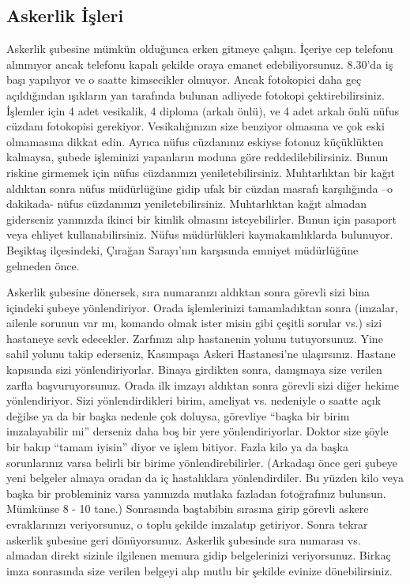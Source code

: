 \documentclass[12pt]{article}
\begin{document}
\subsection{Askerlik İşleri}

Askerlik şubesine mümkün olduğunca erken gitmeye çalışın. İçeriye cep telefonu alınmıyor ancak telefonu kapalı şekilde oraya emanet edebiliyorsunuz. 8.30’da iş başı yapılıyor ve o saatte kimsecikler olmuyor. Ancak fotokopici daha geç açıldığından ışıkların yan tarafında bulunan adliyede fotokopi çektirebilirsiniz. İşlemler için 4 adet vesikalik, 4 diploma (arkalı önlü), ve 4 adet arkalı önlü nüfus cüzdanı fotokopisi gerekiyor. Vesikalığınızın size benziyor olmasına ve çok eski olmamasına dikkat edin. Ayrıca nüfus cüzdanınız eskiyse fotonuz küçüklükten kalmaysa, şubede işleminizi yapanların moduna göre reddedilebilirsiniz. Bunun riskine girmemek için nüfus cüzdanınızı yeniletebilirsiniz. Muhtarlıktan bir kağıt aldıktan sonra nüfus müdürlüğüne gidip ufak bir cüzdan masrafı karşılığında –o dakikada- nüfus cüzdanınızı yeniletebilirsiniz. Muhtarlıktan kağıt almadan giderseniz yanınızda ikinci bir kimlik olmasını isteyebilirler. Bunun için pasaport veya ehliyet kullanabilirsiniz. Nüfus müdürlükleri kaymakamlıklarda bulunuyor. Beşiktaş ilçesindeki, Çırağan Sarayı’nın karşısında emniyet müdürlüğüne gelmeden önce. 

Askerlik şubesine dönersek, sıra numaranızı aldıktan sonra görevli sizi bina içindeki şubeye yönlendiriyor. Orada işlemlerinizi tamamladıktan sonra (imzalar, ailenle sorunun var mı, komando olmak ister misin gibi çeşitli sorular vs.) sizi hastaneye sevk edecekler. Zarfınızı alıp hastanenin yolunu tutuyorsunuz. Yine sahil yolunu takip ederseniz, Kasımpaşa Askeri Hastanesi’ne ulaşırsınız. Hastane kapısında sizi yönlendiriyorlar. 
Binaya girdikten sonra, danışmaya size verilen zarfla başvuruyorsunuz. Orada ilk imzayı aldıktan sonra görevli sizi diğer hekime yönlendiriyor. Sizi yönlendirdikleri birim, ameliyat vs. nedeniyle o saatte açık değilse ya da bir başka nedenle çok doluysa, görevliye “başka bir birim imzalayabilir mi” derseniz daha boş bir yere yönlendiriyorlar. Doktor size şöyle bir bakıp “tamam iyisin” diyor ve işlem bitiyor. Fazla kilo ya da başka sorunlarınız varsa belirli bir birime yönlendirebilirler. (Arkadaşı önce geri şubeye yeni belgeler almaya oradan da iç hastalıklara yönlendirdiler. Bu yüzden kilo veya başka bir probleminiz varsa yanınızda mutlaka fazladan fotoğrafınız bulunsun. Mümkünse 8 - 10 tane.) Sonrasında baştabibin sırasına girip görevli askere evraklarınızı veriyorsunuz, o toplu şekilde imzalatıp getiriyor. Sonra tekrar askerlik şubesine geri dönüyorsunuz. Askerlik şubesinde sıra numarası vs. almadan direkt sizinle ilgilenen memura gidip belgelerinizi veriyorsunuz. Birkaç imza sonrasında size verilen belgeyi alıp mutlu bir şekilde evinize dönebilirsiniz.
\end{document}
